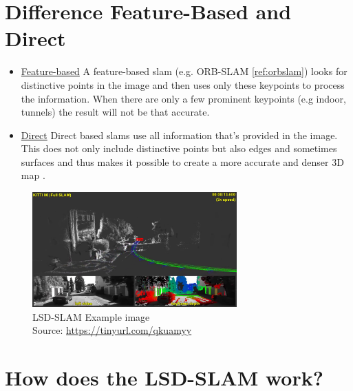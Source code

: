 \section{Difference Feature-Based and Direct}
\begin{itemize}
    \item \underline{Feature-based} \newline
        A feature-based \gls{slam} (e.g. ORB-SLAM \ref{ref:orbslam}) looks for distinctive points in the image and then uses only these keypoints to process the information. When there are only a few prominent keypoints (e.g indoor, tunnels) the result will not be that accurate.
    \item \underline{Direct} \newline
        Direct based \gls{slam}s use all information that's provided in the image. This does not only include distinctive points but also edges and sometimes surfaces and thus makes it possible to create a more accurate and denser 3D map \cite{lsdslam_eccv}.
\end{itemize}
\begin{figure}[h]
	\centering
	\includegraphics[width=0.7\textwidth]{./media/images/lsd-slam.png}
  	\caption{LSD-SLAM Example image
  	\\Source: \url{https://tinyurl.com/qkuamyy}}
  	\label{lsdslam}
\end{figure}

\section{How does the LSD-SLAM work?}

